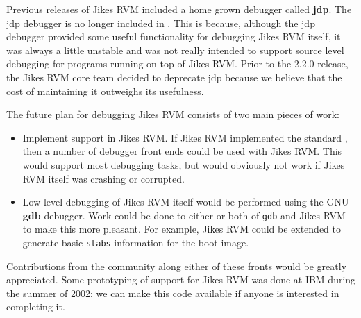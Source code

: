 Previous releases of Jikes\TMweb{} RVM included a home grown
debugger called {\bf jdp}.  The jdp debugger is no longer included in
\jrvm{}.  This is because, although the jdp debugger provided some
useful functionality for debugging Jikes RVM itself, it was always a
little unstable and was not really intended to support source level
debugging for programs running on top of Jikes RVM.  Prior to the
2.2.0 release, the Jikes RVM core team decided to deprecate jdp
because we believe that the cost of maintaining it outweighs its
usefulness.


The future plan for debugging Jikes RVM consists of two main pieces of
work:

\label{JDWP}
\begin{itemize}
\item Implement  support in Jikes RVM. If Jikes RVM
implemented the standard , then a 
number of debugger front ends could be used with Jikes RVM.  This
would support most debugging tasks, but would obviously not work if
Jikes RVM itself was crashing or corrupted.

\item Low level debugging of Jikes RVM itself would be performed using
the GNU {\bf gdb} debugger.  Work could be done to either or both of
{\tt gdb} and Jikes RVM to make this more pleasant.  For example,
Jikes RVM could be extended to generate basic {\tt stabs} information
for the boot image.
\end{itemize}

Contributions from the community along either of these fronts would be
greatly appreciated.  Some prototyping of  support for Jikes RVM
was done at IBM during the summer of 2002; we can make this code
available if anyone is interested in completing it.


